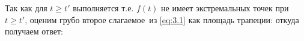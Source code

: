 Так как для $t \ge t'$ выполняется
т.е. $f(t)$ не имеет экстремальных точек при $t \ge t'$, оценим грубо второе слагаемое\
из \eqref{eq:3.1} как площадь трапеции:
откуда получаем 
ответ:
